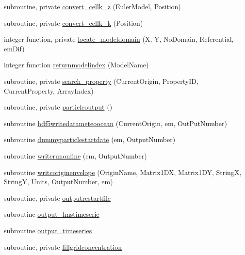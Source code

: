 \begin{DoxyCompactItemize}
subroutine, private \mbox{\hyperlink{namespacemodulelagrangianglobal_ab7f2f6590a59e52fd0c30cdc7445acee}{convert\+\_\+cellk\+\_\+z}} (Euler\+Model, Position)
\item 
subroutine, private \mbox{\hyperlink{namespacemodulelagrangianglobal_a75785d33db5dded34e1de495fe447eac}{convert\+\_\+cellk\+\_\+k}} (Position)
\item 
integer function, private \mbox{\hyperlink{namespacemodulelagrangianglobal_a814ff42a8e2efd519388bc94964a3d13}{locate\+\_\+modeldomain}} (X, Y, No\+Domain, Referential, em\+Dif)
\item 
integer function \mbox{\hyperlink{namespacemodulelagrangianglobal_a446618968d07df360f90a4ddc2d93a99}{returnmodelindex}} (Model\+Name)
\item 
subroutine, private \mbox{\hyperlink{namespacemodulelagrangianglobal_a8101ab80f9478c6164ad8c0d0261efd1}{search\+\_\+property}} (Current\+Origin, Property\+ID, Current\+Property, Array\+Index)
\item 
subroutine, private \mbox{\hyperlink{namespacemodulelagrangianglobal_af6d6a080c97a72125b4959aa01edffd8}{particleoutput}} ()
\item 
subroutine \mbox{\hyperlink{namespacemodulelagrangianglobal_ac7151a37e939cec76ecc163750973cfc}{hdf5writedatameteoocean}} (Current\+Origin, em, Out\+Put\+Number)
\item 
subroutine \mbox{\hyperlink{namespacemodulelagrangianglobal_aa302d13b1ed3a00c85939a4f07802591}{dummyparticlestartdate}} (em, Output\+Number)
\item 
subroutine \mbox{\hyperlink{namespacemodulelagrangianglobal_af58c4faddb51056e6ab9190e049a564b}{writerunonline}} (em, Output\+Number)
\item 
subroutine \mbox{\hyperlink{namespacemodulelagrangianglobal_a50d81f13e10670a1b2e699246cbdaf1f}{writeoriginenvelope}} (Origin\+Name, Matrix1\+DX, Matrix1\+DY, StringX, StringY, Units, Output\+Number, em)
\item 
subroutine, private \mbox{\hyperlink{namespacemodulelagrangianglobal_a9eaa20c6b0f8ebb9961c4eb75eaffb59}{outputrestartfile}}
\item 
subroutine \mbox{\hyperlink{namespacemodulelagrangianglobal_ae56aec86f2575e89f5bacc78d75192a8}{output\+\_\+hnstimeserie}}
\item 
subroutine \mbox{\hyperlink{namespacemodulelagrangianglobal_a9965ea6d7045ff51397b7c8dcddf580c}{output\+\_\+timeseries}}
\item 
subroutine, private \mbox{\hyperlink{namespacemodulelagrangianglobal_ac90a060ac9ab05f2c54c45b4b76ca984}{fillgridconcentration}}

\end{DoxyCompactItemize}
